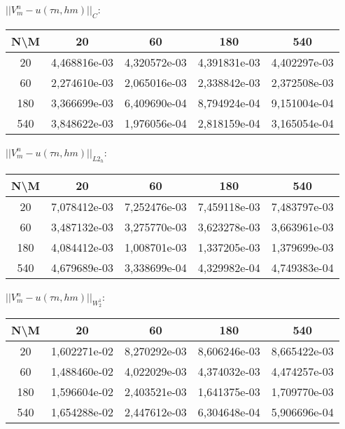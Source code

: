 \documentclass[11pt]{article}
\begin{document}
$||V_m^n - u (\tau n, hm)||_C$:
\begin{center}
\begin{tabular}{|c|c|c|c|c|}
\hline 
 N\textbackslash M &      20      &      60      &     180      &     540      \\ 
 \hline 
        20         & 4,468816e-03 & 4,320572e-03 & 4,391831e-03 & 4,402297e-03 \\ 
 \hline 
        60         & 2,274610e-03 & 2,065016e-03 & 2,338842e-03 & 2,372508e-03 \\ 
 \hline 
        180        & 3,366699e-03 & 6,409690e-04 & 8,794924e-04 & 9,151004e-04 \\ 
 \hline 
        540        & 3,848622e-03 & 1,976056e-04 & 2,818159e-04 & 3,165054e-04 \\ 
 \hline 
\end{tabular}
\end{center}

$||V_m^n - u (\tau n, hm)||_{L2_h}$:
\begin{center}
\begin{tabular}{|c|c|c|c|c|}
\hline 
 N\textbackslash M &      20      &      60      &     180      &     540      \\ 
 \hline 
        20         & 7,078412e-03 & 7,252476e-03 & 7,459118e-03 & 7,483797e-03 \\ 
 \hline 
        60         & 3,487132e-03 & 3,275770e-03 & 3,623278e-03 & 3,663961e-03 \\ 
 \hline 
        180        & 4,084412e-03 & 1,008701e-03 & 1,337205e-03 & 1,379699e-03 \\ 
 \hline 
        540        & 4,679689e-03 & 3,338699e-04 & 4,329982e-04 & 4,749383e-04 \\ 
 \hline 
\end{tabular}
\end{center}

$||V_m^n - u (\tau n, hm)||_{W_2^1}$:
\begin{center}
\begin{tabular}{|c|c|c|c|c|}
\hline 
 N\textbackslash M &      20      &      60      &     180      &     540      \\ 
 \hline 
        20         & 1,602271e-02 & 8,270292e-03 & 8,606246e-03 & 8,665422e-03 \\ 
 \hline 
        60         & 1,488460e-02 & 4,022029e-03 & 4,374032e-03 & 4,474257e-03 \\ 
 \hline 
        180        & 1,596604e-02 & 2,403521e-03 & 1,641375e-03 & 1,709770e-03 \\ 
 \hline 
        540        & 1,654288e-02 & 2,447612e-03 & 6,304648e-04 & 5,906696e-04 \\ 
 \hline 
\end{tabular}
\end{center}
\end{document}
